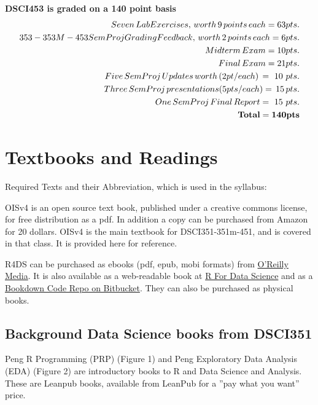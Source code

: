 \documentclass[10pt]{article} %
\begin{document}
  {\bf DSCI453 is graded on a 140 point basis}
  \begin{align*}
    Seven \, Lab Exercises, \, worth \, 9 \, points \, each = 63 pts. \\
    353-353M-453 SemProj Grading Feedback, \, worth \, 2 \, points \, each = 6 pts. \\
    Midterm \, Exam = 10 pts. \\
    Final \, Exam = 21 pts. \\
   Five \, SemProj \, Updates \, worth \, (2 pt/each) \, =  \ 10 \ pts. \\
   Three \, SemProj \, presentations (5 pts/each) = \, 15 \, pts. \\
    One \, SemProj \, Final \, Report  = \ 15 \ pts. \\
    {\bf Total = 140 pts}
  \end{align*}



\section{Textbooks and Readings}

  Required Texts and their Abbreviation, which is used in the syllabus:

  OISv4 is an open source text book, published under a creative commons license, for free distribution as a pdf.
  In addition a copy can be purchased from Amazon for 20 dollars.
  OISv4 is the main textbook for DSCI351-351m-451, and is covered in that class.
  It is provided here for reference.

  R4DS can be purchased as ebooks (pdf, epub, mobi formats) from  \href{"http://www.oreilly.com/"}{O'Reilly Media}.
  It is also available as a web-readable book at \href{http://r4ds.had.co.nz/}{R For Data Science} and as a \href{https://bitbucket.org/cwrudsci/r4ds}{Bookdown Code Repo on Bitbucket}.
  They can also be purchased as physical books.


\FloatBarrier

  \subsection{Background Data Science books from DSCI351}

    Peng R Programming (PRP) (Figure 1) and Peng Exploratory Data Analysis (EDA) (Figure 2) are introductory books to R and Data Science and Analysis.
    These are  Leanpub books, available from LeanPub for a ”pay what you want” price.
\end{document}
